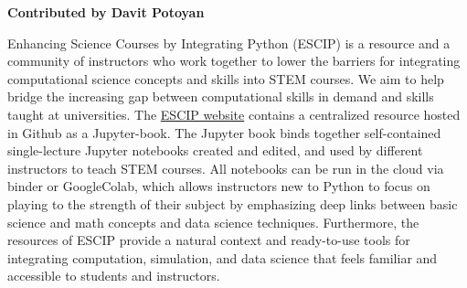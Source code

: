 \textbf{Contributed by Davit Potoyan}

Enhancing Science Courses by Integrating Python (ESCIP) is a resource and a community of instructors who work together to lower the barriers for integrating computational science concepts and skills into STEM courses. 
We aim to help bridge the increasing gap between computational skills in demand and skills taught at universities. 
The \href{https://escip.github.io/}{ESCIP website} contains a centralized resource hosted in Github as a Jupyter-book. 
The Jupyter book binds together self-contained single-lecture Jupyter notebooks created and edited, and used by different instructors to teach STEM courses. 
All notebooks can be run in the cloud via binder or GoogleColab, which allows instructors new to Python to focus on playing to the strength of their subject by emphasizing deep links between basic science and math concepts and data science techniques. 
Furthermore, the resources of ESCIP provide a natural context and ready-to-use tools for integrating computation, simulation, and data science that feels familiar and accessible to students and instructors.

